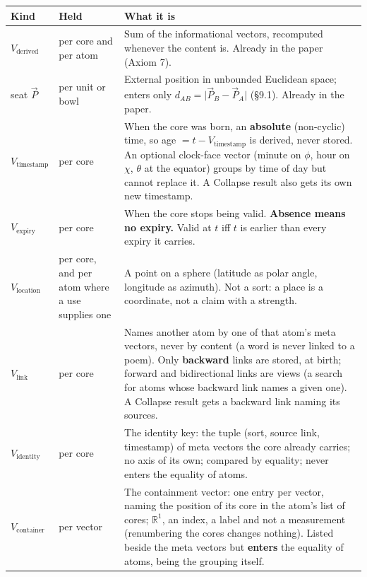 \documentclass[10.5pt]{article}
\begin{document}
{\small\setlength{\tabcolsep}{4pt}\begin{longtable}{L{2.2cm}L{2.6cm}L{11.5cm}}
\toprule
\textbf{Kind} & \textbf{Held} & \textbf{What it is} \\
\midrule
\endhead
$V_{\text{derived}}$ & per core and per atom & Sum of the informational vectors, recomputed whenever the content is. Already in the paper (Axiom 7). \\
seat $\vec P$ & per unit or bowl & External position in unbounded Euclidean space; enters only $d_{AB}=\lvert\vec P_B-\vec P_A\rvert$ (§9.1). Already in the paper. \\
$V_{\text{timestamp}}$ & per core & When the core was born, an \textbf{absolute} (non-cyclic) time, so age $=t-V_{\text{timestamp}}$ is derived, never stored. An optional clock-face vector (minute on $\phi$, hour on $\chi$, $\theta$ at the equator) groups by time of day but cannot replace it. A Collapse result also gets its own new timestamp. \\
$V_{\text{expiry}}$ & per core & When the core stops being valid. \textbf{Absence means no expiry.} Valid at $t$ iff $t$ is earlier than every expiry it carries. \\
$V_{\text{location}}$ & per core, and per atom where a use supplies one & A point on a sphere (latitude as polar angle, longitude as azimuth). Not a sort: a place is a coordinate, not a claim with a strength. \\
$V_{\text{link}}$ & per core & Names another atom by one of that atom's meta vectors, never by content (a word is never linked to a poem). Only \textbf{backward} links are stored, at birth; forward and bidirectional links are views (a search for atoms whose backward link names a given one). A Collapse result gets a backward link naming its sources. \\
$V_{\text{identity}}$ & per core & The identity key: the tuple (sort, source link, timestamp) of meta vectors the core already carries; no axis of its own; compared by equality; never enters the equality of atoms. \\
$V_{\text{container}}$ & per vector & The containment vector: one entry per vector, naming the position of its core in the atom's list of cores; $\mathbb R^1$, an index, a label and not a measurement (renumbering the cores changes nothing). Listed beside the meta vectors but \textbf{enters} the equality of atoms, being the grouping itself. \\
\bottomrule
\end{longtable}}
\end{document}
